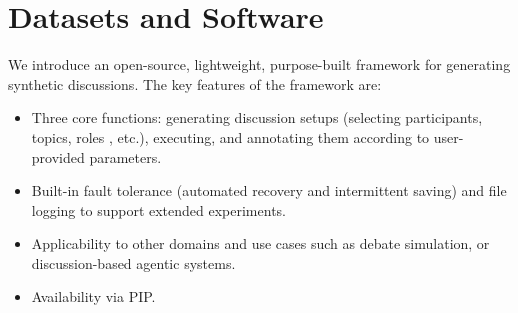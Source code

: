 \section{Datasets and Software}
\label{sec:data-soft}

We introduce an open-source, lightweight, purpose-built framework for generating synthetic discussions. The key features of the framework are: 
\begin{itemize}[nosep,noitemsep]
    \item Three core functions: generating discussion setups (selecting participants, topics, roles , etc.), executing, and annotating them according to user-provided parameters.
    \item Built-in fault tolerance (automated recovery and intermittent saving) and file logging to support extended experiments.
    \item Applicability to other domains and use cases such as debate simulation, or discussion-based agentic systems.
    \item Availability via PIP.
\end{itemize}
